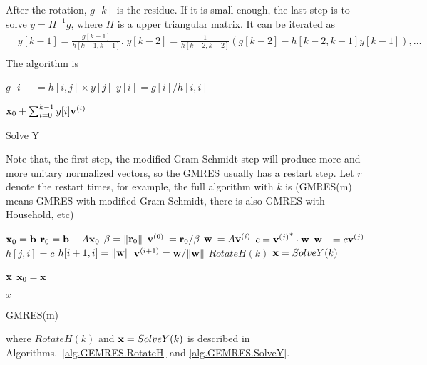 After the rotation, $g[k]$ is the residue. If it is small enough, the last step is to solve $y=H^{-1}g$, where $H$ is a upper triangular matrix. It can be iterated as
\begin{equation}
\begin{split}
&y[k-1]=\frac{g[k-1]}{h[k-1,k-1]}.\;y[k-2]=\frac{1}{h[k-2,k-2]}\left(g[k-2]-h[k-2,k-1]y[k-1]\right),\ldots\\
\end{split}
\end{equation}
The algorithm is
\begin{algorithm}[H]
\begin{algorithmic}
        \State $g[i]-=h[i,j]\times y[j]$
    \EndFor
    \State $y[i] = g[i] / h[i,i]$
\EndFor

\Return ${\bf x}_0+\sum _{i=0}^{k-1}y[i]{\bf v}^{(i)}$
\end{algorithmic}
\caption{\label{alg.GEMRES.SolveY}Solve Y}
\end{algorithm}

Note that, the first step, the modified Gram-Schmidt step will produce more and more unitary normalized vectors, so the GMRES usually has a restart step. Let $r$ denote the restart times, for example, the full algorithm with $k$ is (GMRES(m) means GMRES with modified Gram-Schmidt, there is also GMRES with Household, etc)
\begin{algorithm}[H]
\begin{algorithmic}
\State ${\bf x}_0={\bf b}$
    \State ${\bf r}_0={\bf b}-A{\bf x}_0$
    \State $\beta = \|{\bf r}_0\|$
    \State ${\bf v}^{(0)}\:={\bf r}_0/\beta$
        \State ${\bf w}\:=A{\bf v}^{(i)}$
            \State $c={{\bf v}^{(j)}}^*\cdot {\bf w}$
            \State ${\bf w}-=c{\bf v}^{(j)}$
            \State $h[j,i]=c$
        \EndFor
        \State $h[i+1,i]=\|{\bf w}\|$
        \State ${\bf v}^{(i+1)}={\bf w}/\|{\bf w}\|$
    \EndFor
    \State $RotateH(k)$
    \State ${\bf x}=SolveY(k)$

        \Return ${\bf x}$
    \EndIf
    \State ${\bf x}_0={\bf x}$
\EndFor

\Return $x$
\end{algorithmic}
\caption{GMRES(m)}
\end{algorithm}
where $RotateH(k)$ and ${\bf x}=SolveY(k)$ is described in Algorithms.~\ref{alg.GEMRES.RotateH} and \ref{alg.GEMRES.SolveY}.


